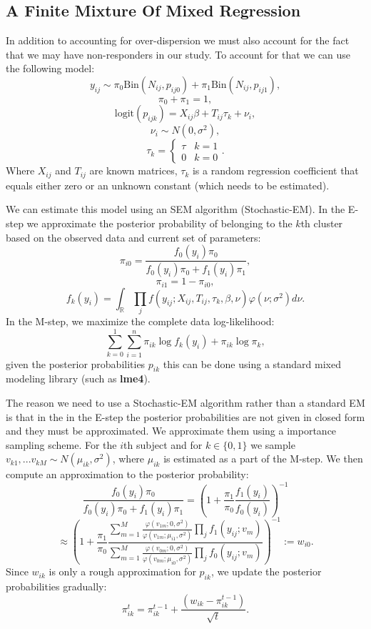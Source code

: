 \documentclass{article}\usepackage[]{graphicx}\usepackage[]{color}
\begin{document}
\subsection{A Finite Mixture Of Mixed Regression}
In addition to accounting for over-dispersion we must also account for the fact that we may have non-responders in our study. To account for that we can use the following model:
$$
y_{ij} \sim \pi_0\text{Bin}(N_{ij}, p_{ij0}) + \pi_1\text{Bin}(N_{ij}, p_{ij1}),
$$$$
\pi_0 + \pi_1 = 1,
$$$$
\text{logit}(p_{ijk}) = X_{ij} \beta + T_{ij}\tau_{k} + \nu_{i},
$$$$
\nu_{i} \sim N(0, \sigma^{2}),
$$$$
\tau_{k} = \begin{cases}
\tau & k = 1 \\
0 & k = 0 
\end{cases}.
$$
Where $X_{ij}$ and $T_{ij}$ are known matrices, $\tau_k$ is a random regression coefficient that equals either zero or an unknown constant (which needs to be estimated).

We can estimate this model using an SEM algorithm (Stochastic-EM). In the E-step we approximate the posterior probability of belonging to the $k$th cluster based on the observed data and current set of parameters:
$$
\pi_{i0} = \frac{f_0(y_{i}) \pi_0}{f_0(y_{i})\pi_0 + f_1(y_{i})\pi_1},
$$$$
\pi_{i1} = 1 - \pi_{i0},
$$$$
f_k(y_{i}) = \int_{\mathbb{R}} \prod_{j} f(y_{ij} ; X_{ij}, T_{ij}, \tau_k, \beta, \nu) \varphi(\nu;\sigma^{2})d\nu.
$$
In the M-step, we maximize the complete data log-likelihood:
$$
\sum_{k=0}^{1}\sum_{i=1}^{n} \pi_{ik}\log f_k(y_i) + \pi_{ik} \log \pi_{k},
$$
given the posterior probabilities $p_{ik}$ this can be done using a standard mixed modeling library (such as \textbf{lme4}). 

The reason we need to use a Stochastic-EM algorithm rather than a standard EM is that in the in the E-step the posterior probabilities are not given in closed form and they must be approximated. We approximate them using a importance sampling scheme. For the $i$th subject and for $k\in \{0, 1\}$ we sample $v_{k1},...v_{kM} \sim N(\mu_{ik}, \sigma^{2})$, where $\mu_{ik}$ is estimated as a part of the M-step. We then compute an approximation to the posterior probability:
$$
\frac{f_0(y_{i}) \pi_0}{f_0(y_{i})\pi_0 + f_1(y_{i})\pi_1} 
= \left(1 + \frac{\pi_1}{\pi_0}\frac{f_1(y_{i})}{f_0(y_i)} \right)^{-1}
$$$$
\approx  \left(1 + \frac{\pi_1}{\pi_0}
\frac{\sum_{m=1}^{M} \frac{\varphi(v_{1m};0,\sigma^{2})}{\varphi(v_{1m}; \mu_{i1}, \sigma^{2})}\prod_{j} f_1(y_{ij} ; v_{m})}
{\sum_{m=1}^{M}\frac{\varphi(v_{0m};0,\sigma^{2})}{\varphi(v_{0m}; \mu_{i0}, \sigma^{2})} \prod_{j} f_0(y_{ij} ; v_{m})} 
\right)^{-1} 
:= w_{i0}.
$$
Since $w_{ik}$ is only a rough approximation for $p_{ik}$,  we update the posterior probabilities gradually:
$$
\pi_{ik}^{t} = \pi_{ik}^{t-1} + \frac{(w_{ik} - \pi_{ik}^{t-1})}{\sqrt{t}}.
$$
\end{document}
